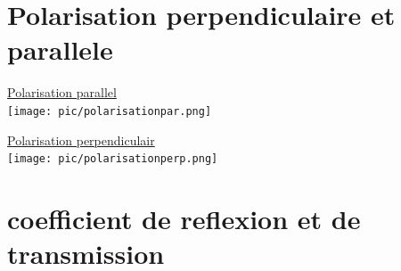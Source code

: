 \documentclass[12pt]{book}
\begin{document}
        \section{Polarisation perpendiculaire et parallele}
                \begin{center}
                    \begin{minipage}{0.49\linewidth}
                        \underline{Polarisation parallel} \\
                        \texttt{[image: pic/polarisationpar.png]}
                    \end{minipage}
                    \begin{minipage}{0.49\linewidth}
                        \underline{Polarisation perpendiculair} \\
                        \texttt{[image: pic/polarisationperp.png]}
                    \end{minipage}
                \end{center}
        \section{coefficient de reflexion et de transmission }
\end{document}
